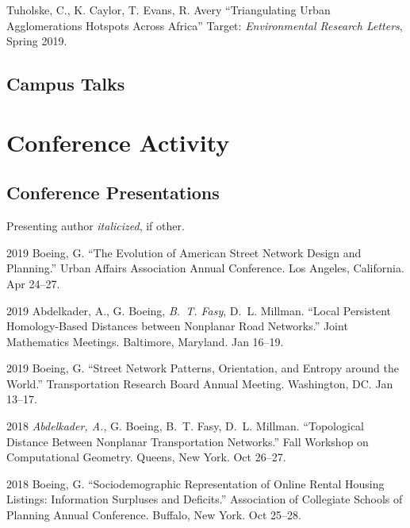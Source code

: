 \documentclass[12pt,letterpaper]{report}
\begin{document}
\begin{tablist}
\begin{tablist}
		\item[\the\year] \tab Tuholske, C., K. Caylor, T. Evans, R. Avery \enquote{Triangulating Urban Agglomerations Hotspots Across Africa} Target: \textit{Environmental Research Letters}, Spring 2019.
	
	\end{tablist}
	
	\subsection*{Campus Talks}
	
    \section*{Conference Activity}
	
	
	\subsection*{Conference Presentations}
	
	Presenting author \textit{italicized}, if other.\bigskip
	
	\begin{tablist}
		
		\item[2019] \tab Boeing, G. \enquote{The Evolution of American Street Network Design and Planning.} Urban Affairs Association Annual Conference. Los Angeles, California. Apr 24--27.
		
		\item[2019] \tab Abdelkader, A., G. Boeing, \textit{B.~T. Fasy}, D.~L. Millman. \enquote{Local Persistent Homology-Based Distances between Nonplanar Road Networks.} Joint Mathematics Meetings. Baltimore, Maryland. Jan 16--19.
		
		\item[2019] \tab Boeing, G. \enquote{Street Network Patterns, Orientation, and Entropy around the World.} Transportation Research Board Annual Meeting. Washington, DC. Jan 13--17.
		
		\item[2018] \tab \textit{Abdelkader, A.}, G. Boeing, B.~T. Fasy, D.~L. Millman. \enquote{Topological Distance Between Nonplanar Transportation Networks.} Fall Workshop on Computational Geometry. Queens, New York. Oct 26--27.
		
		\item[2018] \tab Boeing, G. \enquote{Sociodemographic Representation of Online Rental Housing Listings: Information Surpluses and Deficits.} Association of Collegiate Schools of Planning Annual Conference. Buffalo, New York. Oct 25--28.
		

\end{tablist}
\end{tablist}
\end{document}
